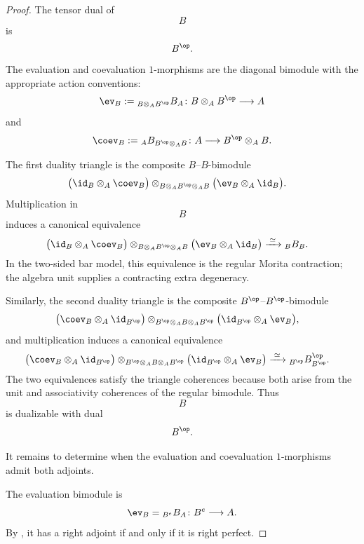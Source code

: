 \begin{proof}
The tensor dual of
\[
    B
\]
is
\[
    B^{\op}.
\]
The evaluation and coevaluation $1$-morphisms are the diagonal bimodule
with the appropriate action conventions:
\[
    \ev_B
    :=
    {}_{B\otimes_A B^{\op}}B_A
    \colon
    B\otimes_A B^{\op}
    \longrightarrow
    A
\]
and
\[
    \coev_B
    :=
    {}_A B_{B^{\op}\otimes_A B}
    \colon
    A
    \longrightarrow
    B^{\op}\otimes_A B.
\]

The first duality triangle is the composite $B$--$B$-bimodule
\[
\begin{aligned}
    &\bigl(
        \id_B\otimes_A\coev_B
    \bigr)
    \otimes_{B\otimes_A B^{\op}\otimes_A B}
    \bigl(
        \ev_B\otimes_A\id_B
    \bigr).
\end{aligned}
\]
Multiplication in
\[
    B
\]
induces a canonical equivalence
\[
\begin{aligned}
    &\bigl(
        \id_B\otimes_A\coev_B
    \bigr)
    \otimes_{B\otimes_A B^{\op}\otimes_A B}
    \bigl(
        \ev_B\otimes_A\id_B
    \bigr)
    \xrightarrow{\;\simeq\;}
    {}_B B_B.
\end{aligned}
\]
In the two-sided bar model, this equivalence is the regular Morita
contraction; the algebra unit supplies a contracting extra degeneracy.

Similarly, the second duality triangle is the composite
$B^{\op}$--$B^{\op}$-bimodule
\[
\begin{aligned}
    &\bigl(
        \coev_B\otimes_A\id_{B^{\op}}
    \bigr)
    \otimes_{B^{\op}\otimes_A B\otimes_A B^{\op}}
    \bigl(
        \id_{B^{\op}}\otimes_A\ev_B
    \bigr),
\end{aligned}
\]
and multiplication induces a canonical equivalence
\[
\begin{aligned}
    &\bigl(
        \coev_B\otimes_A\id_{B^{\op}}
    \bigr)
    \otimes_{B^{\op}\otimes_A B\otimes_A B^{\op}}
    \bigl(
        \id_{B^{\op}}\otimes_A\ev_B
    \bigr)
    \xrightarrow{\;\simeq\;}
    {}_{B^{\op}}B^{\op}_{B^{\op}}.
\end{aligned}
\]
The two equivalences satisfy the triangle coherences because both arise
from the unit and associativity coherences of the regular bimodule.
Thus
\[
    B
\]
is dualizable with dual
\[
    B^{\op}.
\]

It remains to determine when the evaluation and coevaluation
$1$-morphisms admit both adjoints.

The evaluation bimodule is
\[
    \ev_B
    =
    {}_{B^e}B_A
    \colon
    B^e
    \longrightarrow
    A.
\]
By
,
it has a right adjoint if and only if it is right perfect.


\end{proof}
